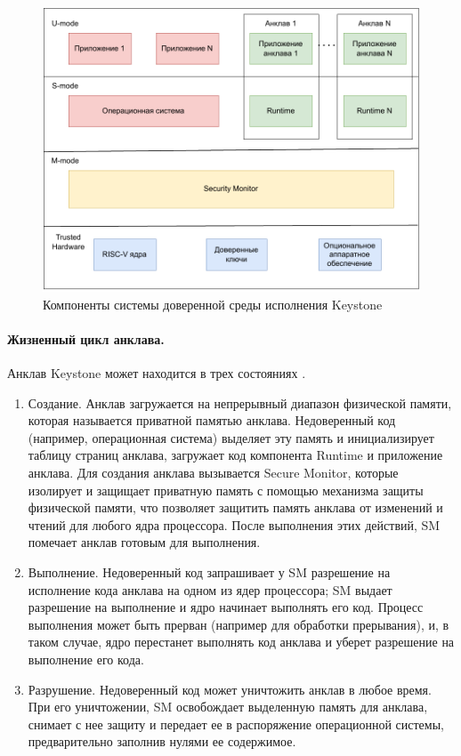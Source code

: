 \begin{figure}[h]
	\centering
	\includegraphics[width=\textwidth]{img/riscv-enclave-arch.pdf}
	\caption{Компоненты системы доверенной среды исполнения Keystone}
	\label{fig:riscv-enclave-arch}
\end{figure}

\paragraph{Жизненный цикл анклава.}

Анклав Keystone может находится в трех состояниях \cite{keystone-overview}.

\begin{enumerate}[label*=\arabic*.]
	\item Создание. Анклав загружается на непрерывный диапазон физической памяти, которая называется приватной памятью анклава. Недоверенный код (например, операционная система) выделяет эту память и инициализирует таблицу страниц анклава, загружает код компонента Runtime и приложение анклава. Для создания анклава вызывается Secure Monitor, которые изолирует и защищает приватную память с помощью механизма защиты физической памяти, что позволяет защитить память анклава от изменений и чтений для любого ядра процессора. После выполнения этих действий, SM помечает анклав  готовым для выполнения.
	\item Выполнение. Недоверенный код запрашивает у SM разрешение на исполнение кода анклава на одном из ядер процессора; SM выдает разрешение на выполнение и ядро начинает выполнять его код. Процесс выполнения может быть прерван (например для обработки прерывания), и, в таком случае, ядро перестанет выполнять код анклава и уберет разрешение на выполнение его кода.
	\item Разрушение. Недоверенный код может уничтожить анклав в любое время. При его уничтожении, SM освобождает выделенную память для анклава, снимает с нее защиту и передает ее в распоряжение операционной системы, предварительно заполнив нулями ее содержимое.
\end{enumerate}

